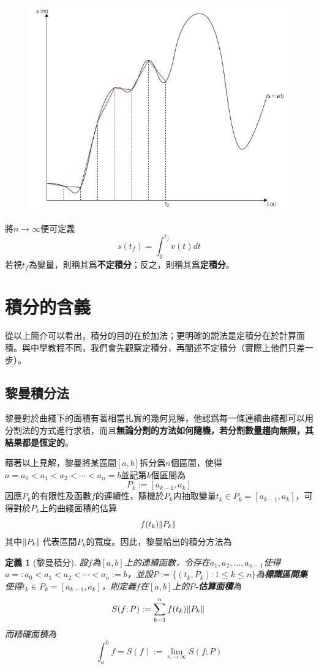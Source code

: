 \documentclass[12pt]{article}
\newtheorem{definition}{定義}
\begin{document}
    \begin{figure}[H]
        \centering
        \includegraphics[scale=0.6]{partition s-t.png}
    \end{figure}

    將$n\to\infty$便可定義$$s(t_f)=\int_{0}^{t_f}v(t)dt$$若視$t_f$為變量，則稱其爲\textbf{不定積分}；反之，則稱其爲\textbf{定積分}。
    
    \section*{積分的含義}
    從以上簡介可以看出，積分的目的在於加法；更明確的説法是定積分在於計算面積。與中學教程不同，我們會先觀察定積分，再闡述不定積分（實際上他們只差一步）。

    \subsection*{黎曼積分法}
    黎曼對於曲綫下的面積有著相當扎實的幾何見解，他認爲每一條連續曲綫都可以用分割法的方式進行求積，而且\textbf{無論分割的方法如何隨機，若分割數量趨向無限，其結果都是恆定的}。

    藉著以上見解，黎曼將某區間$[a,b]$拆分爲$n$個區間，使得$a=a_0<a_1<a_2<\cdots<a_n=b$並記第$k$個區間為$$P_k:=[a_{k-1},a_k]$$因應$P_k$的有限性及函數$f$的連續性，隨機於$P_k$内抽取變量$t_k\in P_k=[a_{k-1},a_k]$，可得對於$P_k$上的曲綫面積的估算$$f(t_k)\norm*{P_k}$$其中$\norm*{P_k}$代表區間$P_k$的寬度。因此，黎曼給出的積分方法為

    \begin{definition}[黎曼積分]
        設$f$為$[a,b]$上的連續函數，令存在$a_1,a_2,\dots,a_{n-1}$使得$a=:a_0<a_1<a_2<\cdots<a_n:=b$，並設$P:=\{(t_k,P_k):1\leq k\leq n\}$為\textbf{標識區間集}使得$t_k\in P_k=[a_{k-1},a_k]$，則定義$f$在$[a,b]$上的\textbf{$P$-估算面積}為$$S(f;P):=\sum_{k=1}^{n}f(t_k)\norm*{P_k}$$
        而精確面積為$$\int_{a}^{b}f=S(f):=\lim_{n\to \infty}S(f;P)$$
    \end{definition}
\end{document}
